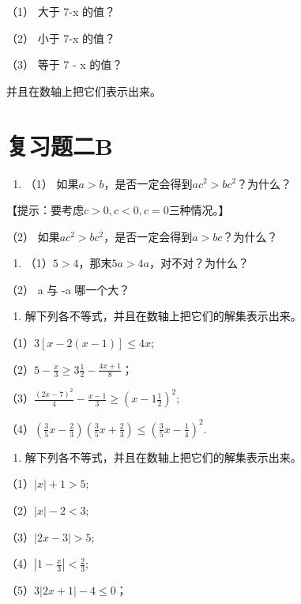 （1） 大于 7-x 的值？

（2） 小于 7-x 的值？

（3） 等于 7 - x 的值？

并且在数轴上把它们表示出来。

\section{复习题二B}

\begin{enumerate}
\item
  （1） 如果\(a > b\)，是否一定会得到\(ac^2 > bc^2\)？为什么？
\end{enumerate}

【提示：要考虑\(c > 0, c < 0, c = 0\)三种情况。】

（2） 如果\(ac^2 > bc^2\)，是否一定会得到\(a > bc\)？为什么？

\begin{enumerate}[start=2]
\item
  （1）\(5 > 4\)，那末\(5a > 4a\)，对不对？为什么？
\end{enumerate}

（2） a 与 -a 哪一个大？

\begin{enumerate}[start=3]
\item
  解下列各不等式，并且在数轴上把它们的解集表示出来。
\end{enumerate}

（1）\(3[x-2(x-1)] \leqslant 4x;\)

（2）\(5 - \frac{x}{3} \geqslant 3\frac{1}{2} - \frac{4x + 1}{8}\)；

（3）\(\frac{(2x - 7)^2}{4} - \frac{x - 1}{3} \geqslant \left(x - 1\frac{1}{2}\right)^2;\)

（4）\(\left(\frac{3}{5} x - \frac{2}{3}\right)\left(\frac{3}{5} x + \frac{2}{3}\right) \leqslant \left(\frac{3}{5} x - \frac{1}{4}\right)^2.\)

\begin{enumerate}[start=4]
\item
  解下列各不等式，并且在数轴上把它们的解集表示出来。
\end{enumerate}

（1）\(|x| + 1 > 5;\)

（2）\(|x| - 2 < 3;\)

（3）\(|2x-3|>5;\)

（4）\(\left|1-\frac{x}{3}\right|<\frac{2}{3};\)

（5）\(3|2x + 1| - 4 \leqslant 0\)；

